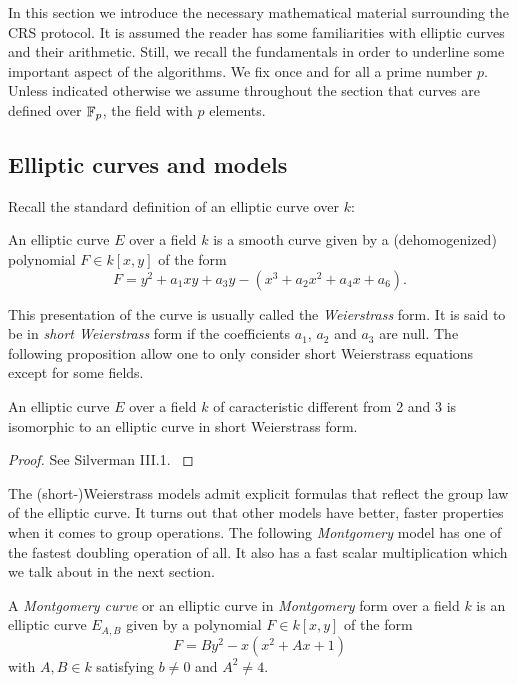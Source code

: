 \documentclass[../main/main.tex]{subfiles}
\begin{document}
In this section we introduce the necessary mathematical material surrounding the CRS protocol.
It is assumed the reader has some familiarities with elliptic curves and their arithmetic.
Still, we recall the fundamentals in order to underline some important aspect of the algorithms.
We fix once and for all a prime number $p$.
Unless indicated otherwise we assume throughout the section that curves are defined over $\mathbb{F}_p$, the field with $p$ elements.


\subsection{Elliptic curves and models}
Recall the standard definition of an elliptic curve over $k$:
\begin{definition}
	An elliptic curve $E$ over a field $k$ is a smooth curve given by a (dehomogenized) polynomial $F\in k[x,y]$ of the form
	\[
		F = y^2 + a_1xy + a_3y - (x^3 +a_2 x^2 + a_4 x + a_6).
	\]
\end{definition}
This presentation of the curve is usually called the \textit{Weierstrass} form.
It is said to be in \textit{short Weierstrass} form if the coefficients $a_1$, $a_2$ and $a_3$ are null.
The following proposition allow one to only consider short Weierstrass equations except for some fields.
\begin{proposition}
	An elliptic curve $E$ over a field $k$ of caracteristic different from 2 and 3 is isomorphic to an elliptic curve in short Weierstrass form.
\end{proposition}
\begin{proof}
	See Silverman III.1. \cite{}
\end{proof}
The (short-)Weierstrass models admit explicit formulas that reflect the group law of the elliptic curve.
It turns out that other models have better, faster properties when it comes to group operations.
The following \textit{Montgomery} model has one of the fastest doubling operation of all.
It also has a fast scalar multiplication which we talk about in the next section.
\begin{definition}
	A \textit{Montgomery curve} or an elliptic curve in \textit{Montgomery} form over a field $k$ is an elliptic curve $E_{A, B}$ given by a polynomial $F\in k[x, y]$ of the form
	\[
		F = By^2 - x(x^2+Ax + 1)
	\]
	with $A, B\in k$ satisfying $b\neq 0$ and $A^2\neq 4$.
\end{definition}
\end{document}
